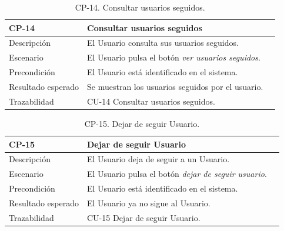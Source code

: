         \begin{table}[H]
            \centering
            \begin{tabularx}{1\textwidth} { 
                | >{\raggedright\arraybackslash}X 
                | >{\raggedright\arraybackslash}X 
                | >{\raggedright\arraybackslash}X
                |  }
            \hline
            \textbf{CP-14}     & \textbf{Consultar usuarios seguidos}                             \\ \hline
            Descripción        & El Usuario consulta sus usuarios seguidos.      \\ \hline
            Escenario          & El Usuario pulsa el botón \textit{ver usuarios seguidos}.                           \\ \hline
            Precondición          & El Usuario está identificado en el sistema.                             \\ \hline
            
            Resultado esperado & Se muestran los usuarios seguidos por el usuario. \\ \hline
            Trazabilidad & CU-14 Consultar usuarios seguidos.\\ \hline
        \end{tabularx}
        \caption{CP-14. Consultar usuarios seguidos.}
        \label{table:CP-14}
            \end{table}



            
        \begin{table}[H]
            \centering
            \begin{tabularx}{1\textwidth} { 
                | >{\raggedright\arraybackslash}X 
                | >{\raggedright\arraybackslash}X 
                | >{\raggedright\arraybackslash}X 
                |  }
            \hline
            \textbf{CP-15}     & \textbf{Dejar de seguir Usuario}                             \\ \hline
            Descripción        & El Usuario deja de seguir a un Usuario.      \\ \hline
            Escenario          & El Usuario pulsa el botón \textit{dejar de seguir usuario}.                           \\ \hline
            Precondición          & El Usuario está identificado en el sistema.                             \\ \hline
          
            Resultado esperado & El Usuario ya no sigue al Usuario. \\ \hline
            Trazabilidad & CU-15 Dejar de seguir Usuario.\\ \hline
        \end{tabularx}
        \caption{CP-15. Dejar de seguir Usuario.}
        \label{table:CP-15}
            \end{table}



